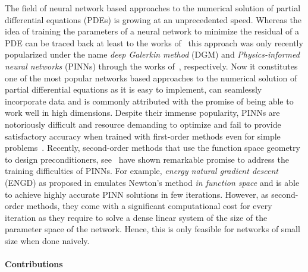 
The field of neural network based approaches to the numerical solution of partial differential equations (PDEs) is growing at an unprecedented speed.%
Whereas the idea of training the parameters of a neural network to minimize the residual of a PDE can be traced back at least to the works of~\cite{dissanayake1994neural, lagaris1998artificial} this approach was only recently popularized under the name \emph{deep Galerkin method} (DGM) and \emph{Physics-informed neural networks} (PINNs) through the works of~\cite{sirignano2018dgm, raissi2019physics}, respectively.  
Now it constitutes one of the most popular networks based approaches to the numerical solution of partial differential equations as it is easy to implement, can seamlessly incorporate data and is commonly attributed with the promise of being able to work well in high dimensions. 
Despite their immense popularity, PINNs are notoriously difficult and resource demanding to optimize \cite{wang2021understanding} and fail to provide satisfactory accuracy when trained with first-order methods even for simple problems~\cite{zeng2022competitive, muller2023achieving}. Recently, second-order methods that use the function space geometry to design preconditioners, see~\citep{zeng2022competitive, muller2023achieving, de2023operator} have shown remarkable promise to address the training difficulties of PINNs. For example, \emph{energy natural gradient descent} (ENGD) as proposed in \cite{muller2023achieving} emulates Newton's method \emph{in function space} and is able to achieve highly accurate PINN solutions in few iterations. However, as second-order methods, they come with a significant computational cost for every iteration as they require to solve a dense linear system of the size of the parameter space of the network. Hence, this is only feasible for networks of small size when done naively.


\paragraph{Contributions} %

